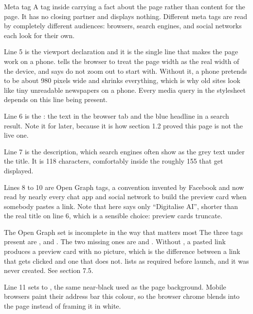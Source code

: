 \begin{jargon}{Meta tag}
A tag inside  carrying a fact about the page rather than content for
the page. It has no closing partner and displays nothing. Different meta tags are
read by completely different audiences: browsers, search engines, and social
networks each look for their own.
\end{jargon}

Line 5 is the viewport declaration and it is the single line that makes the page
work on a phone.  tells the browser to treat the page
width as the real width of the device, and  says do not
zoom out to start with. Without it, a phone pretends to be about 980 pixels wide
and shrinks everything, which is why old sites look like tiny unreadable
newspapers on a phone. Every media query in the stylesheet depends on this line
being present.

Line 6 is the : the text in the browser tab and the blue headline
in a search result. Note it for later, because it is how section 1.2 proved this
page is not the live one.

Line 7 is the description, which search engines often show as the grey text under
the title. It is 118 characters, comfortably inside the roughly 155 that get
displayed.

Lines 8 to 10 are Open Graph tags, a convention invented by Facebook and now read
by nearly every chat app and social network to build the preview card when
somebody pastes a link. Note that  here says only ``Digitalise
AI'', shorter than the real title on line 6, which is a sensible choice: preview
cards truncate.

\begin{honest}{The Open Graph set is incomplete in the way that matters most}
The three tags present are ,  and
. The two missing ones are  and .
Without , a pasted link produces a preview card with no picture,
which is the difference between a link that gets clicked and one that does not.
 lists  as required before launch, and it was
never created. See section 7.5.
\end{honest}

Line 11 sets  to , the same near-black used as
the page background. Mobile browsers paint their address bar this colour, so the
browser chrome blends into the page instead of framing it in white.

